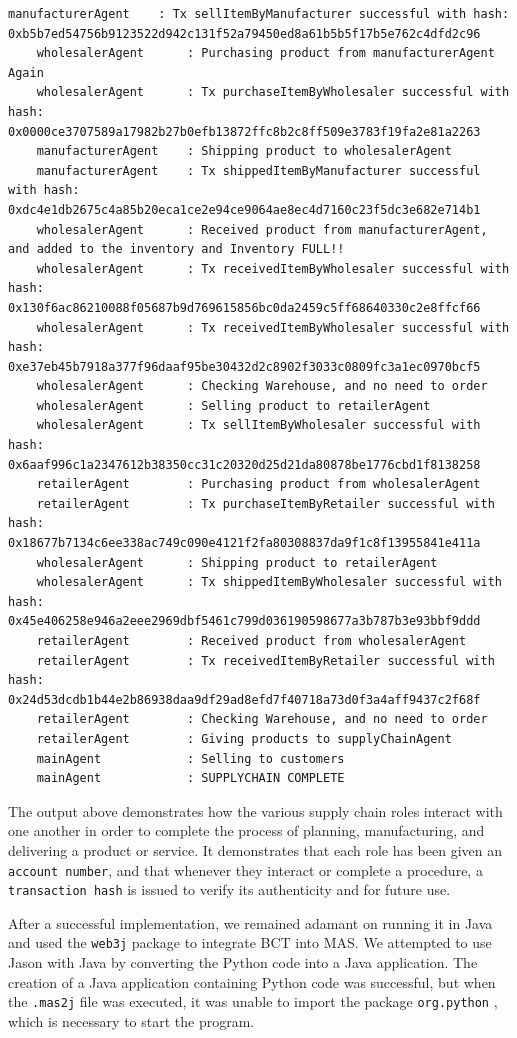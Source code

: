 \begin{itemize}
\begin{lstlisting}[numbers=none, basicstyle=\ttfamily\tiny]
    manufacturerAgent    : Tx sellItemByManufacturer successful with hash: 0xb5b7ed54756b9123522d942c131f52a79450ed8a61b5b5f17b5e762c4dfd2c96
    wholesalerAgent      : Purchasing product from manufacturerAgent Again
    wholesalerAgent      : Tx purchaseItemByWholesaler successful with hash: 0x0000ce3707589a17982b27b0efb13872ffc8b2c8ff509e3783f19fa2e81a2263
    manufacturerAgent    : Shipping product to wholesalerAgent
    manufacturerAgent    : Tx shippedItemByManufacturer successful with hash: 0xdc4e1db2675c4a85b20eca1ce2e94ce9064ae8ec4d7160c23f5dc3e682e714b1
    wholesalerAgent      : Received product from manufacturerAgent, and added to the inventory and Inventory FULL!!
    wholesalerAgent      : Tx receivedItemByWholesaler successful with hash: 0x130f6ac86210088f05687b9d769615856bc0da2459c5ff68640330c2e8ffcf66
    wholesalerAgent      : Tx receivedItemByWholesaler successful with hash: 0xe37eb45b7918a377f96daaf95be30432d2c8902f3033c0809fc3a1ec0970bcf5
    wholesalerAgent      : Checking Warehouse, and no need to order
    wholesalerAgent      : Selling product to retailerAgent
    wholesalerAgent      : Tx sellItemByWholesaler successful with hash: 0x6aaf996c1a2347612b38350cc31c20320d25d21da80878be1776cbd1f8138258
    retailerAgent        : Purchasing product from wholesalerAgent
    retailerAgent        : Tx purchaseItemByRetailer successful with hash: 0x18677b7134c6ee338ac749c090e4121f2fa80308837da9f1c8f13955841e411a
    wholesalerAgent      : Shipping product to retailerAgent
    wholesalerAgent      : Tx shippedItemByWholesaler successful with hash: 0x45e406258e946a2eee2969dbf5461c799d036190598677a3b787b3e93bbf9ddd
    retailerAgent        : Received product from wholesalerAgent
    retailerAgent        : Tx receivedItemByRetailer successful with hash: 0x24d53dcdb1b44e2b86938daa9df29ad8efd7f40718a73d0f3a4aff9437c2f68f
    retailerAgent        : Checking Warehouse, and no need to order
    retailerAgent        : Giving products to supplyChainAgent
    mainAgent            : Selling to customers
    mainAgent            : SUPPLYCHAIN COMPLETE
    \end{lstlisting}
    
    \end{itemize}


The output above demonstrates how the various supply chain roles interact with one another in order to complete the process of planning, manufacturing, and delivering a product or service. It demonstrates that each role has been given an \texttt{account number}, and that whenever they interact or complete a procedure, a \texttt{transaction hash} is issued to verify its authenticity and for future use.

\vspace{.5cm}

After a successful implementation, we remained adamant on running it in Java and used the \texttt{web3j} package to integrate \ac{BCT} into \ac{MAS}. We attempted to use Jason with Java by converting the Python code into a Java application. The creation of a Java application containing Python code was successful, but when the \texttt{.mas2j} file was executed, it was unable to import the package \texttt{org.python} , which is necessary to start the program.